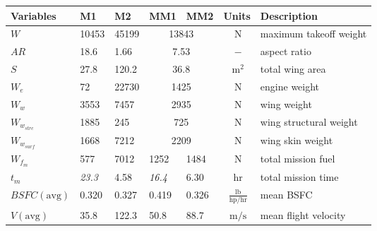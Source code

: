 \begin{footnotesize}
\begin{longtable}{lllllcl}
\toprule
Variables & M1 & M2 & MM1 & MM2 & Units & Description \\
\midrule
$W$ & 10453 & 45199 & \multicolumn{2}{c}{13843} & $~\mathrm{N}$ & maximum takeoff weight \\
$AR$ & 18.6 & 1.66 & \multicolumn{2}{c}{7.53} & $~\mathrm{-}$ & aspect ratio \\
$S$ & 27.8 & 120.2 & \multicolumn{2}{c}{36.8} & $~\mathrm{m^{2}}$ & total wing area \\
$W_e$ & 72 & 22730 & \multicolumn{2}{c}{1425} & $~\mathrm{N}$ & engine weight\\
$W_w$ & 3553 & 7457 & \multicolumn{2}{c}{2935} & $~\mathrm{N}$ & wing weight \\
$W_{w_{strc}}$ & 1885 & 245 & \multicolumn{2}{c}{725} & $~\mathrm{N}$ & wing structural weight\\
$W_{w_{surf}}$ & 1668 & 7212 & \multicolumn{2}{c}{2209} & $~\mathrm{N}$ & wing skin weight \\
$W_{f_m}$ & 577 & 7012 & 1252 & 1484 & $~\mathrm{N}$ & total mission fuel \\
$t_m$ & \textit{23.3} & 4.58 & \textit{16.4} & 6.30 & $~\mathrm{hr}$ & total mission time\\
$BSFC \mathrm{(avg)}$ & 0.320 & 0.327 & 0.419 & 0.326 & $~\mathrm{\frac{lb}{hp/hr}}$ & mean BSFC \\
$V \mathrm{(avg)}$ & 35.8 & 122.3 & 50.8 & 88.7 & $~\mathrm{m/s}$ & mean flight velocity \\
\bottomrule
\end{longtable}
\end{footnotesize}
